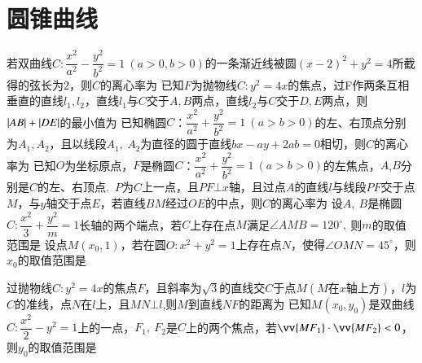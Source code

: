 \documentclass{BHCexam}
\begin{document}
\section{圆锥曲线}
\begin{questions}
	\qs 若双曲线$C:\dfrac{x^2}{a^2}-\dfrac{y^2}{b^2}=1~(a>0,b>0)$的一条渐近线被圆$ \left(x-2\right)^2+y^2=4 $所截得的弦长为$2$，则$ C $的离心率为\xx
	\qs 已知$F$为抛物线$C:y^2=4x$的焦点，过F作两条互相垂直的直线$l_1,l_2$，直线$l_1$与$C$交于$A,B$两点，直线$l_2$与$C$交于$D,E$两点，则$\left|AB\right|+\left|DE\right|$的最小值为\xx
	\qs 已知椭圆$C$：$\dfrac{x^2}{a^2}+\dfrac{y^2}{b^2}=1~(a>b>0)$的左、右顶点分别为$A_1,A_2$，且以线段$ A_1,~A_2 $为直径的圆于直线$ bx-ay+2ab=0 $相切，则$ C $的离心率为\xx
	\question
	已知$O$为坐标原点，$F$是椭圆$C$：$\dfrac{x^2}{a^2}+\dfrac{y^2}{b^2}=1~(a>b>0)$的左焦点，$A$,$B$分别是$C$的左、右顶点.~$P$为$C$上一点，且$PF\bot x$轴，且过点$A$的直线$l$与线段$PF$交于点$M$，与$y$轴交于点$E$，若直线$BM$经过$OE$的中点，则$C$的离心率为\xx 
	\qs 设$ A,~B $是椭圆$ C:\dfrac{x^2}{3}+\dfrac{y^2}{m}=1 $长轴的两个端点，若$ C $上存在点$ M $满足$ \angle AMB=120^{\circ},~ $则$ m $的取值范围是\xx
	\twoch{$ \left(0,1\right]\cup\left[9,+\infty\right)$}{$ \left(0,\sqrt{3}\right]\cup\left[9,+\infty\right)$}{$\left(0,1\right]\cup\left[4,+\infty\right) $}{$\left(0,\sqrt{3}\right]\cup\left[4,+\infty\right) $}
	\qs 设点$ M(x_0,1) $，若在圆$ O:x^2+y^2=1 $上存在点$ N $，使得$ \angle OMN=45^{\circ} $，则$ x_0 $的取值范围是\xx
	

	\qs 过抛物线$ C:y^2=4x $的焦点$F$，且斜率为$ \sqrt{3} $的直线交$C$于点$M \left(M\text{在}x\text{轴上方}\right)$，$l$为$C$的准线，点$N$在$l$上，且$MN\bot l$,则$M$到直线$NF$的距离为\xx
	\qs 已知$ M\left(x_0,y_0\right) $是双曲线$ C:\dfrac{x^2}{2} -y^2=1$上的一点，$ F_1,~F_2 $是$ C $上的两个焦点，若$ \vv{MF_1}\cdot\vv{MF_2}<0 $，则$ y_0 $的取值范围是\xx
\begin{spacing}{1.4 }
\end{spacing}


\end{questions}
\end{document}

